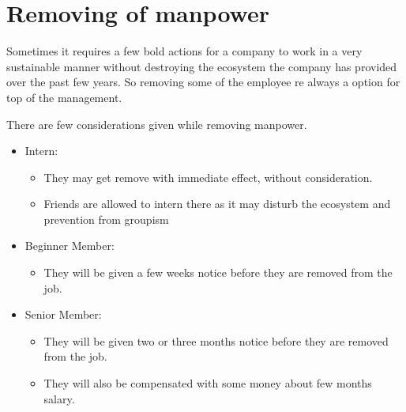 \section{Removing of manpower}
Sometimes it requires a few bold actions for a company to work in a very sustainable manner without destroying the ecosystem the company has provided over the past few years. So removing some of the employee re always a option for top of the management.

There are few considerations given while removing manpower.
\begin{itemize}
    \item Intern:
    \begin{itemize}
        \item They may get remove with immediate effect, without consideration.
        \item Friends are allowed to intern there as it may disturb the ecosystem and prevention from groupism
    \end{itemize}    
    \item Beginner Member:
    \begin{itemize}
        \item They will be given a few weeks notice before they are removed from the job.
    \end{itemize}
    \item Senior Member:
    \begin{itemize}
        \item They will be given two or three months notice before they are removed from the job.
        \item They will also be compensated with some money about few months salary.
    \end{itemize}
    
\end{itemize}

 

